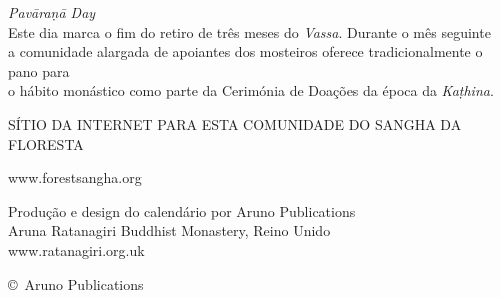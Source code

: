 {{\emph{Pavāraṇā Day} \spacedcdot\ \xDatePavarana\\
Este dia marca o fim do retiro de três meses do \emph{Vassa}. Durante o mês seguinte\\
a comunidade alargada de apoiantes dos mosteiros oferece tradicionalmente o pano para\\
o hábito monástico como parte da Cerimónia de Doações da época da \emph{Kaṭhina}.

\bigskip

{\large SÍTIO DA INTERNET PARA ESTA COMUNIDADE DO SANGHA DA FLORESTA}

www.forestsangha.org

\bigskip

Produção e design do calendário por Aruno Publications\\
Aruna Ratanagiri Buddhist Monastery, Reino Unido\\
www.ratanagiri.org.uk

\copyright\ Aruno Publications \CopyrightYear\\

\vfill
\mbox{}
}}

